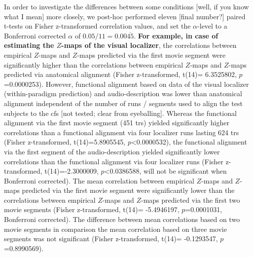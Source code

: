 %
In order to investigate the differences between some conditions [well, if you
know what I mean] more closely, we post-hoc performed eleven [final number?]
paired t-tests on Fisher z-transformed correlation values, and set the
$\alpha$-level to a Bonferroni corrected $\alpha$ of $0.05 / 11 =
0.00\overline{45}$.
%
\textbf{For example, in case of estimating the $Z$-maps of the visual
localizer}, the correlations between empirical $Z$-maps and $Z$-maps predicted
via the first movie segment were significantly higher than the correlations
between empirical $Z$-maps and $Z$-maps predicted via anatomical alignment
(Fisher z-transformed, t(14)= 6.3525802, $p$=0.0000253).
%
However, functional alignment based on data of the visual localizer
(within-paradigm prediction) and audio-description was lower than anatomical
alignment independent of the number of runs / segments used to align the test
subjects to the \ac{cfs} [not tested; clear from eyeballing].
%
Whereas the functional alignment via the first movie segment (451 \acp{tr})
yielded significantly higher correlations than a functional alignment via four
localizer runs lasting 624 \acp{tr} (Fisher z-transformed, t(14)=5.8905545,
$p$<0.0000532),
%
the functional alignment via the first segment of the audio-description yielded
significantly lower correlations than the functional alignment via four
localizer runs (Fisher z-transformed, t(14)=-2.3000009, $p$<0.0386588, will not
be significant when Bonferroni corrected).
%
The mean correlation between empirical $Z$-maps and $Z$-maps predicted via the
first movie segment were significantly lower than the correlations between
empirical $Z$-maps and $Z$-maps predicted via the first two movie segments
(Fisher z-transformed, t(14)= -5.4946197, $p$=0.0001031, Bonferroni corrected).
%
The difference between mean correlations based on two movie segments in
comparison the mean correlation based on three movie segments was not
significant (Fisher z-transformed, t(14)= -0.1293547, $p$=0.8990569).



